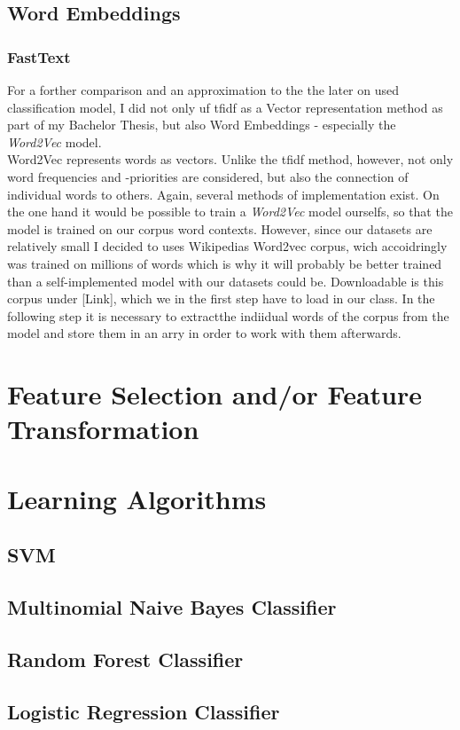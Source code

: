 \documentclass[a4paper, 11pt,titlepage,oneside,openany]{book}
\begin{document}
\subsection{Word Embeddings}
\subsubsection{FastText} 
For a forther comparison and an approximation to the the later on used classification model, I did not only uf \gls{tfidf} as a Vector representation method as part of my Bachelor Thesis, but also Word Embeddings - especially the \textit{Word2Vec} model. \\
\noindent Word2Vec represents words as vectors. Unlike the  \gls{tfidf} method, however, not only word frequencies and -priorities are considered, but also the connection of individual words to others. Again, several methods of implementation exist. On the one hand it would be possible to train a \textit{Word2Vec} model ourselfs, so that the model is trained on our corpus word contexts. However, since our datasets are relatively small I decided to uses Wikipedias Word2vec corpus, wich accoidringly was trained on millions of words which is why it will probably be better trained than a self-implemented model with our datasets could be. Downloadable is this corpus under [Link], which we in the first step have to load in our class. In the following step it is necessary to extractthe indiidual words of the corpus from the model and store them in an arry in order to work with them afterwards.
\section{Feature Selection and/or Feature Transformation}
\section{Learning Algorithms}
\subsection{SVM}
\subsection{Multinomial Naive Bayes Classifier}
\subsection{Random Forest Classifier}
\subsection{Logistic Regression Classifier}
\newpage
\end{document}
